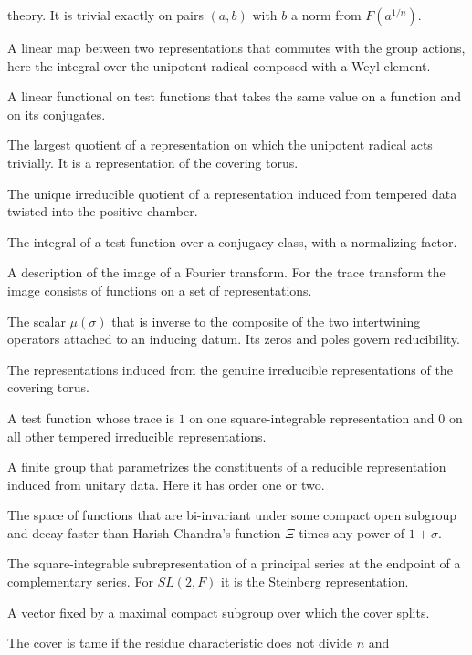 \documentclass[12pt,letterpaper]{article}
\numberwithin{equation}{section}
\theoremstyle{definition}
\begin{document}
\begin{description}[leftmargin=0.6cm,style=nextline,itemsep=2pt]
theory.  It is trivial exactly on pairs $(a,b)$ with $b$ a norm from $F(a^{1/n})$.
\item[Intertwining operator] A linear map between two representations that commutes with
the group actions, here the integral over the unipotent radical composed with a Weyl
element.
\item[Invariant distribution] A linear functional on test functions that takes the same
value on a function and on its conjugates.
\item[Jacquet module] The largest quotient of a representation on which the unipotent
radical acts trivially.  It is a representation of the covering torus.
\item[Langlands quotient] The unique irreducible quotient of a representation induced
from tempered data twisted into the positive chamber.
\item[Orbital integral] The integral of a test function over a conjugacy class, with a
normalizing factor.
\item[Paley--Wiener theorem] A description of the image of a Fourier transform.  For the
trace transform the image consists of functions on a set of representations.
\item[Plancherel measure] The scalar $\mu(\sigma)$ that is inverse to the composite of the
two intertwining operators attached to an inducing datum.  Its zeros and poles govern
reducibility.
\item[Principal series] The representations induced from the genuine irreducible
representations of the covering torus.
\item[Pseudo-coefficient] A test function whose trace is $1$ on one square-integrable
representation and $0$ on all other tempered irreducible representations.
\item[$R$-group] A finite group that parametrizes the constituents of a reducible
representation induced from unitary data.  Here it has order one or two.
\item[Schwartz space] The space of functions that are bi-invariant under some compact
open subgroup and decay faster than Harish-Chandra's function $\Xi$ times any power of
$1+\sigma$.
\item[Special representation] The square-integrable subrepresentation of a principal
series at the endpoint of a complementary series.  For $SL(2,F)$ it is the Steinberg
representation.
\item[Spherical vector] A vector fixed by a maximal compact subgroup over which the cover
splits.
\item[Tame, wild] The cover is tame if the residue characteristic does not divide $n$ and

\end{description}
\end{document}
